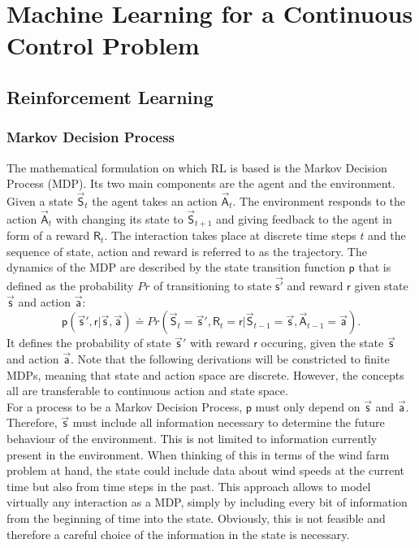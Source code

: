 \section{Machine Learning for a Continuous Control Problem}
\subsection{Reinforcement Learning}
\subsubsection{Markov Decision Process}
The mathematical formulation on which RL is based is the Markov Decision Process (MDP). Its two main components are the agent and the environment. Given a state $\vec{\mathsf{S}}_t$ the agent takes an action $\vec{\mathsf{A}}_t$. The environment responds to the action $\vec{\mathsf{A}}_t$ with changing its state to $\vec{\mathsf{S}}_{t+1}$ and giving feedback to the agent in form of a reward $\mathsf{R}_t$. The interaction takes place at discrete time steps $t$ and the sequence of state, action and reward is referred to as the trajectory. The dynamics of the MDP are described by the state transition function $\mathsf{p}$ that is defined as the probability $Pr$ of transitioning to state $\vec{\mathsf{s'}}$ and reward $\mathsf{r}$ given state $\vec{\mathsf{s}}$ and action $\vec{\mathsf{a}}$:
\begin{equation}
\mathsf{p}(\vec{\mathsf{s}}',\mathsf{r} \vert \vec{\mathsf{s}},\vec{\mathsf{a}}) \doteq Pr(\vec{\mathsf{S}}_t=\vec{\mathsf{s}}', \mathsf{R}_t=\mathsf{r} \vert \vec{\mathsf{S}}_{t-1} = \vec{\mathsf{s}}, \vec{\mathsf{A}}_{t-1} = \vec{\mathsf{a}}). \label{eq:prob_func}
\end{equation}
It defines the probability of state $\vec{\mathsf{s}}'$ with reward $\mathsf{r}$ occuring, given the state $\vec{\mathsf{s}}$ and action $\vec{\mathsf{a}}$. Note that the following derivations will be constricted to finite MDPs, meaning that state and action space are discrete. However, the concepts all are transferable to continuous action and state space. \\
For a process to be a Markov Decision Process, $\mathsf{p}$ must only depend on $\vec{\mathsf{s}}$ and $\vec{\mathsf{a}}$. Therefore, $\vec{\mathsf{s}}$ must include all information necessary to determine the future behaviour of the environment. This is not limited to information currently present in the environment. When thinking of this in terms of the wind farm problem at hand, the state could include data about wind speeds at the current time but also from time steps in the past. This approach allows to model virtually any interaction as a MDP, simply by including every bit of information from the beginning of time into the state. Obviously, this is not feasible and therefore a careful choice of the information in the state is necessary. \\
